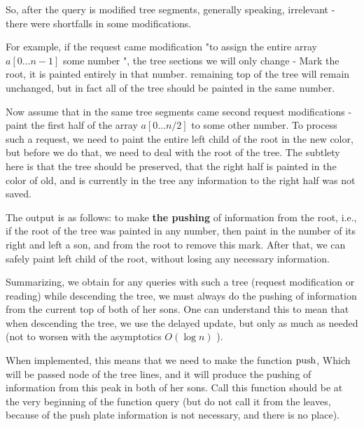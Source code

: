 So, after the query is modified tree segments, generally speaking, irrelevant - there were shortfalls in some modifications.

For example, if the request came modification "to assign the entire array $a [0 \ldots n-1]$ some number ", the tree sections we will only change - Mark the root, it is painted entirely in that number. remaining top of the tree will remain unchanged, but in fact all of the tree should be painted in the same number.

Now assume that in the same tree segments came second request modifications - paint the first half of the array $a [0 \ldots n / 2]$ to some other number. To process such a request, we need to paint the entire left child of the root in the new color, but before we do that, we need to deal with the root of the tree. The subtlety here is that the tree should be preserved, that the right half is painted in the color of old, and is currently in the tree any information to the right half was not saved.

The output is as follows: to make \textbf{the pushing} of information from the root, i.e., if the root of the tree was painted in any number, then paint in the number of its right and left a son, and from the root to remove this mark. After that, we can safely paint left child of the root, without losing any necessary information.

Summarizing, we obtain for any queries with such a tree (request modification or reading) while descending the tree, we must always do the pushing of information from the current top of both of her sons. One can understand this to mean that when descending the tree, we use the delayed update, but only as much as needed (not to worsen with the asymptotics $O (\log n)$ ).

When implemented, this means that we need to make the function $\rm push$, Which will be passed node of the tree lines, and it will produce the pushing of information from this peak in both of her sons. Call this function should be at the very beginning of the function query (but do not call it from the leaves, because of the push plate information is not necessary, and there is no place).

